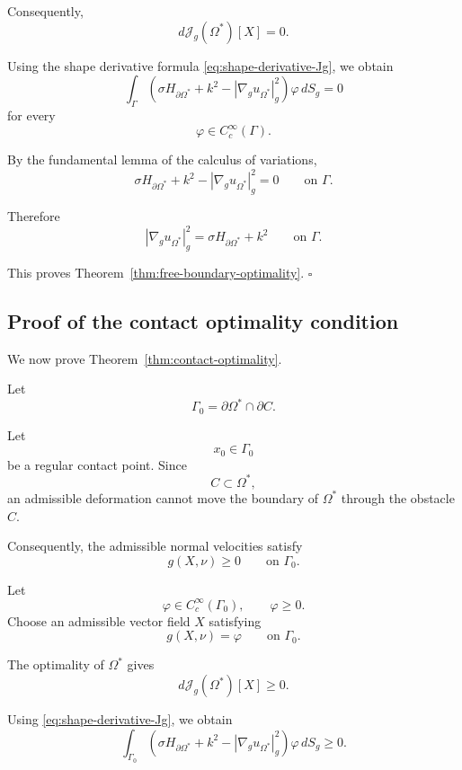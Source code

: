 \documentclass{article}
\renewcommand{\boxed}[1]{#1}
\begin{document}
Consequently,
\[
d\mathcal J_g(\Omega^\ast)[X]=0.
\]

Using the shape derivative formula
\eqref{eq:shape-derivative-Jg}, we obtain
\begin{equation}
\int_\Gamma
\left(
\sigma H_{\partial\Omega^\ast}
+k^2
-
|\nabla_g u_{\Omega^\ast}|_g^2
\right)
\varphi\,dS_g
=0
\end{equation}
for every
\[
\varphi\in C_c^\infty(\Gamma).
\]

By the fundamental lemma of the calculus of variations,
\[
\sigma H_{\partial\Omega^\ast}
+k^2
-
|\nabla_g u_{\Omega^\ast}|_g^2
=0
\qquad\text{on }\Gamma.
\]

Therefore
\[
\boxed{
|\nabla_g u_{\Omega^\ast}|_g^2
=
\sigma H_{\partial\Omega^\ast}+k^2
\qquad\text{on }\Gamma.
}
\]

This proves Theorem~\ref{thm:free-boundary-optimality}.
\hfill$\square$


\subsection{Proof of the contact optimality condition}
\label{subsec:proof-contact}

We now prove Theorem~\ref{thm:contact-optimality}.

Let
\[
\Gamma_0
=
\partial\Omega^\ast\cap\partial C.
\]

Let
\[
x_0\in\Gamma_0
\]
be a regular contact point. Since
\[
C\subset\Omega^\ast,
\]
an admissible deformation cannot move the boundary of $\Omega^\ast$
through the obstacle $C$.

Consequently, the admissible normal velocities satisfy
\begin{equation}
g(X,\nu)\geq0
\qquad\text{on }\Gamma_0.
\label{eq:contact-velocity-proof}
\end{equation}

Let
\[
\varphi\in C_c^\infty(\Gamma_0),
\qquad
\varphi\geq0.
\]
Choose an admissible vector field $X$ satisfying
\[
g(X,\nu)=\varphi
\qquad\text{on }\Gamma_0.
\]

The optimality of $\Omega^\ast$ gives
\[
d\mathcal J_g(\Omega^\ast)[X]\geq0.
\]

Using
\eqref{eq:shape-derivative-Jg}, we obtain
\begin{equation}
\int_{\Gamma_0}
\left(
\sigma H_{\partial\Omega^\ast}
+k^2
-
|\nabla_g u_{\Omega^\ast}|_g^2
\right)
\varphi\,dS_g
\geq0.
\end{equation}
\end{document}
